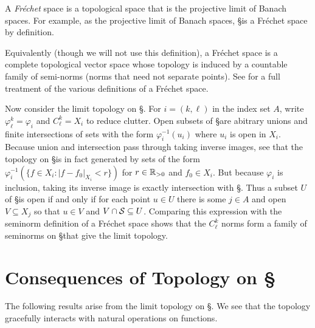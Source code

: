       \begin{defn}
        A \emph{Fr\'echet} space is a topological space that is the projective limit of Banach spaces.
        For example, as the projective limit of Banach spaces, \S is a Fr\'echet space by definition.

        Equivalently (though we will not use this definition), a Fr\'echet space is a complete topological vector space whose topology is induced by a countable family of semi-norms (norms that need not separate points).
        See \citet[]{functionsoncircles} for a full treatment of the various definitions of a Fr\'echet space.
      \end{defn}

      Now consider the limit topology on \S.
      For $i=(k,\ell)$ in the index set $A$, write $\varphi^k_\ell = \varphi_i$ and $C^k_\ell=X_i$ to reduce clutter.
      Open subsets of \S are abitrary unions and finite intersections of sets with the form $\varphi_i^{-1}(u_i)$ where $u_i$ is open in $X_i$.
      Because union and intersection pass through taking inverse images, see that the topology on \S is in fact generated by sets of the form $\varphi_i^{-1}(\{f\in X_i:|f-f_0|_{X_i}<r\})$ for $r\in\R_{>0}$ and $f_0\in X_i$.
      But because $\varphi_i$ is inclusion, taking its inverse image is exactly intersection with \S.
      Thus a subset $U$ of \S is open if and only if for each point $u\in U$ there is some $j\in A$ and open $V\subseteq X_j$ so that $u\in V$ and $V\cap\S\subseteq U$.
      Comparing this expression with the seminorm definition of a Fr\'echet space shows that the $C^k_\ell$ norms form a family of seminorms on \S that give the limit topology.


    \section{Consequences of Topology on \S}
      The following results arise from the limit topology on \S.
      We see that the topology gracefully interacts with natural operations on functions.

